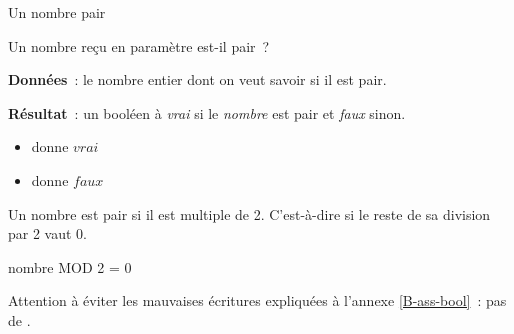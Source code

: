 \begin{Fiche}{Un nombre pair}
\label{fiche:calcul-pair}

	Un nombre reçu en paramètre est-il pair~?


	\textbf{Données}~: le nombre entier dont on veut savoir si il est pair.
		
	\textbf{Résultat}~: un booléen à \textit{vrai} si le \textit{nombre} est pair et \textit{faux} sinon.

	\begin{center}	
	\end{center}


	\begin{itemize}
	\item {} donne $vrai$
	\item {} donne $faux$
	\end{itemize}
	

	Un nombre est pair si il est multiple de 2. 
	C’est-à-dire si le reste de sa division par 2 vaut 0.

	\begin{LDA}
			\Return nombre MOD 2 = 0
		\EndAlgo
	\end{LDA}

	Attention à éviter les mauvaises écritures 
	expliquées à l’annexe \vref{B-ass-bool}~:
	pas de \lda{\K{si-sinon}}.
	



\end{Fiche}
